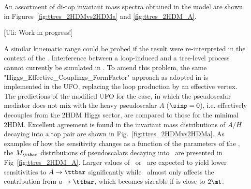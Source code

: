 An assortment of di-top invariant mass spectra obtained in the \hdma model are shown in Figures~\ref{fig:ttres_2HDMvs2HDMa} and \ref{fig:ttres_2HDM_A}. 

{\color{red} [Uli: Work in progress!]}

 A similar kinematic range could be probed if the result were re-interpreted in the context of the \hdma. Interference between
a loop-induced and a tree-level process cannot currently be simulated in \mg. To amend this problem, the same "Higgs\_Effective\_Couplings\_FormFactor"
approach \cite{ttinterfHFF} as adopted in \cite{Aaboud:2017hnm} is implemented in the UFO, replacing the loop production by an 
effective vertex. The predictions of the modified UFO for the case, in which the pseudoscalar mediator does not mix with the heavy pseudoscalar $A$ ($\sinp=0$), i.e. effectively decouples from the 2HDM Higgs sector, are compared to those for the minimal 2HDM. Excellent agreement is found in the invariant mass distributions of $A/H$ decaying into a top pair are shown in Fig.~\ref{fig:ttres_2HDMvs2HDMa}. As examples of how the sensitivity changes as a function of the parameters of the \hdma, the $M_{\ttbar}$ distributions of pseudoscalars decaying into \ttbar\ are presented in Fig~\ref{fig:ttres_2HDM_A}. Larger values of \tanb\ or \sinp\ are expected to yield lower sensitivities to $A\rightarrow\ttbar$ significantly while \ma\ almost only affects the contribution from $a\rightarrow\ttbar$, which becomes sizeable if \ma is close to $2\mt$.



